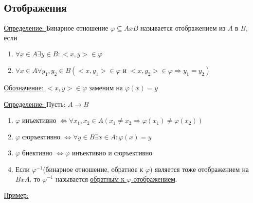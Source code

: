 \documentclass[12pt]{article}
\begin{document}
    \subsection{Отображения}
    \underline{Определение: } Бинарное отношение $\varphi \subseteq A x B$ называется отображением из $A$ в $B$,
    если 
    \begin{enumerate}
        \item $\forall x \in A \exists y \in B: <x,y> \in \varphi$
        \item $\forall x \in A \forall y_1,y_2 \in B 
        (<x,y_1> \in \varphi \text{ и } <x,y_2> \in \varphi \Rightarrow y_1 = y_2)$
    \end{enumerate}
    \underline{Обозначение: } $<x,y> \in \varphi$ заменим на $\varphi(x) = y$
    \pagebreak
    
    \underline{Определение: } Пусть: $A \rightarrow B$
    \begin{enumerate}
        \item $\varphi$ инъективно $\Leftrightarrow \forall x_1,x_2 \in A (x_1 \not = x_2 
        \Rightarrow \varphi(x_1) \not = \varphi(x_2) )$
        \item  $\varphi$ сюръективно $\Leftrightarrow \forall y \in B \exists x \in A : \varphi(x) = y$
        \item $\varphi$ биективно $\Leftrightarrow \varphi$ инъективно и сюръективно
        \item Если $\varphi^{-1}$(бинарное отношение, обратное к $\varphi$) является тоже отображением на $BxA$,
        то $\varphi^{-1}$ называется \underline{обратным к $\varphi$ отображением}.
    \end{enumerate}
    \underline{Пример:}
\end{document}
